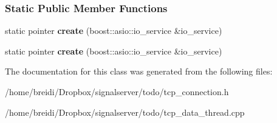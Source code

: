 \subsubsection*{Static Public Member Functions}
\begin{DoxyCompactItemize}
\item 
\hypertarget{classtcp__connection_a5ddd316caf7f95163acbed9cff76c02e}{
static pointer {\bfseries create} (boost::asio::io\_\-service \&io\_\-service)}
\label{classtcp__connection_a5ddd316caf7f95163acbed9cff76c02e}

\item 
\hypertarget{classtcp__connection_a5ddd316caf7f95163acbed9cff76c02e}{
static pointer {\bfseries create} (boost::asio::io\_\-service \&io\_\-service)}
\label{classtcp__connection_a5ddd316caf7f95163acbed9cff76c02e}

\end{DoxyCompactItemize}


The documentation for this class was generated from the following files:\begin{DoxyCompactItemize}
\item 
/home/breidi/Dropbox/signalserver/todo/tcp\_\-connection.h\item 
/home/breidi/Dropbox/signalserver/todo/tcp\_\-data\_\-thread.cpp\end{DoxyCompactItemize}

